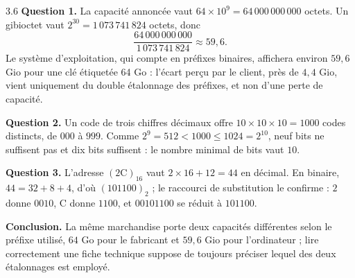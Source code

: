 \begin{corrige}{3.6}
\textbf{Question 1.} La capacité annoncée vaut $64 \times 10^9 = 64\,000\,000\,000$ octets. Un gibioctet vaut $2^{30} = 1\,073\,741\,824$ octets, donc
\[
\frac{64\,000\,000\,000}{1\,073\,741\,824} \approx 59{,}6.
\]
Le système d'exploitation, qui compte en préfixes binaires, affichera environ $59{,}6$ Gio pour une clé étiquetée 64 Go : l'écart perçu par le client, près de $4{,}4$ Gio, vient uniquement du double étalonnage des préfixes, et non d'une perte de capacité.

\textbf{Question 2.} Un code de trois chiffres décimaux offre $10 \times 10 \times 10 = 1000$ codes distincts, de $000$ à $999$. Comme $2^9 = 512 < 1000 \leqslant 1024 = 2^{10}$, neuf bits ne suffisent pas et dix bits suffisent : le nombre minimal de bits vaut $10$.

\textbf{Question 3.} L'adresse $(2\mathrm{C})_{16}$ vaut $2 \times 16 + 12 = 44$ en décimal. En binaire, $44 = 32 + 8 + 4$, d'où $(101100)_2$ ; le raccourci de substitution le confirme : $2$ donne $0010$, C donne $1100$, et $00101100$ se réduit à $101100$.

\textbf{Conclusion.} La même marchandise porte deux capacités différentes selon le préfixe utilisé, $64$ Go pour le fabricant et $59{,}6$ Gio pour l'ordinateur ; lire correctement une fiche technique suppose de toujours préciser lequel des deux étalonnages est employé.
\end{corrige}
